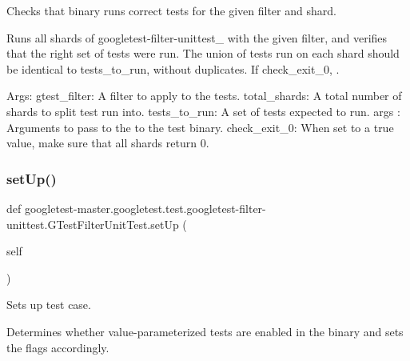 \begin{DoxyVerb}Checks that binary runs correct tests for the given filter and shard.

Runs all shards of googletest-filter-unittest_ with the given filter, and
verifies that the right set of tests were run. The union of tests run
on each shard should be identical to tests_to_run, without duplicates.
If check_exit_0, .

Args:
  gtest_filter: A filter to apply to the tests.
  total_shards: A total number of shards to split test run into.
  tests_to_run: A set of tests expected to run.
  args   :      Arguments to pass to the to the test binary.
  check_exit_0: When set to a true value, make sure that all shards
            return 0.
\end{DoxyVerb}
 \mbox{\label{classgoogletest-master_1_1googletest_1_1test_1_1googletest-filter-unittest_1_1_g_test_filter_unit_test_a8af7e355d961a23f7339852a8d3a00e1}} 
\subsubsection{\texorpdfstring{setUp()}{setUp()}}
{\footnotesize\ttfamily def googletest-\/master.\+googletest.\+test.\+googletest-\/filter-\/unittest.\+G\+Test\+Filter\+Unit\+Test.\+set\+Up (\begin{DoxyParamCaption}\item[{}]{self }\end{DoxyParamCaption})}

\begin{DoxyVerb}Sets up test case.

Determines whether value-parameterized tests are enabled in the binary and
sets the flags accordingly.
\end{DoxyVerb}
 \mbox{\label{classgoogletest-master_1_1googletest_1_1test_1_1googletest-filter-unittest_1_1_g_test_filter_unit_test_a5117f5e6ccf8337880d3f38333a10977}} 
